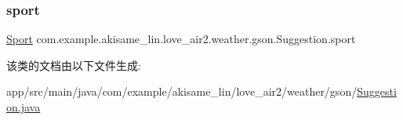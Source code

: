 \subsubsection{\texorpdfstring{sport}{sport}}
{\footnotesize\ttfamily \mbox{\hyperlink{classcom_1_1example_1_1akisame__lin_1_1love__air2_1_1weather_1_1gson_1_1_suggestion_1_1_sport}{Sport}} com.\+example.\+akisame\+\_\+lin.\+love\+\_\+air2.\+weather.\+gson.\+Suggestion.\+sport}



该类的文档由以下文件生成\+:\begin{DoxyCompactItemize}
\item 
app/src/main/java/com/example/akisame\+\_\+lin/love\+\_\+air2/weather/gson/\mbox{\hyperlink{java_2com_2example_2akisame__lin_2love__air2_2weather_2gson_2_suggestion_8java}{Suggestion.\+java}}\end{DoxyCompactItemize}
